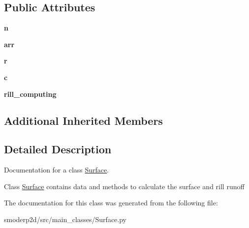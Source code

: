\subsection*{Public Attributes}
\begin{DoxyCompactItemize}
\item 
\hypertarget{classsmoderp2d_1_1src_1_1main__classes_1_1Surface_1_1Surface_aa7c6b79c82e4fdc3c10618352f6f8a95}{{\bfseries n}}\label{classsmoderp2d_1_1src_1_1main__classes_1_1Surface_1_1Surface_aa7c6b79c82e4fdc3c10618352f6f8a95}

\item 
\hypertarget{classsmoderp2d_1_1src_1_1main__classes_1_1Surface_1_1Surface_a7e6c8ba706c0e4a66c5cf9c6411d97f5}{{\bfseries arr}}\label{classsmoderp2d_1_1src_1_1main__classes_1_1Surface_1_1Surface_a7e6c8ba706c0e4a66c5cf9c6411d97f5}

\item 
\hypertarget{classsmoderp2d_1_1src_1_1main__classes_1_1Surface_1_1Surface_a65f67746247e945119a01f15d10cf78c}{{\bfseries r}}\label{classsmoderp2d_1_1src_1_1main__classes_1_1Surface_1_1Surface_a65f67746247e945119a01f15d10cf78c}

\item 
\hypertarget{classsmoderp2d_1_1src_1_1main__classes_1_1Surface_1_1Surface_a6af217c6e409f4f36839b469c70e537f}{{\bfseries c}}\label{classsmoderp2d_1_1src_1_1main__classes_1_1Surface_1_1Surface_a6af217c6e409f4f36839b469c70e537f}

\item 
\hypertarget{classsmoderp2d_1_1src_1_1main__classes_1_1Surface_1_1Surface_a582cc99afa50aa905ee83b83e88f1300}{{\bfseries rill\-\_\-computing}}\label{classsmoderp2d_1_1src_1_1main__classes_1_1Surface_1_1Surface_a582cc99afa50aa905ee83b83e88f1300}

\end{DoxyCompactItemize}
\subsection*{Additional Inherited Members}


\subsection{Detailed Description}
Documentation for a class \hyperlink{classsmoderp2d_1_1src_1_1main__classes_1_1Surface_1_1Surface}{Surface}. 

Class \hyperlink{classsmoderp2d_1_1src_1_1main__classes_1_1Surface_1_1Surface}{Surface} contains data and methods to calculate the surface and rill runoff 

The documentation for this class was generated from the following file\-:\begin{DoxyCompactItemize}
\item 
smoderp2d/src/main\-\_\-classes/Surface.\-py\end{DoxyCompactItemize}
